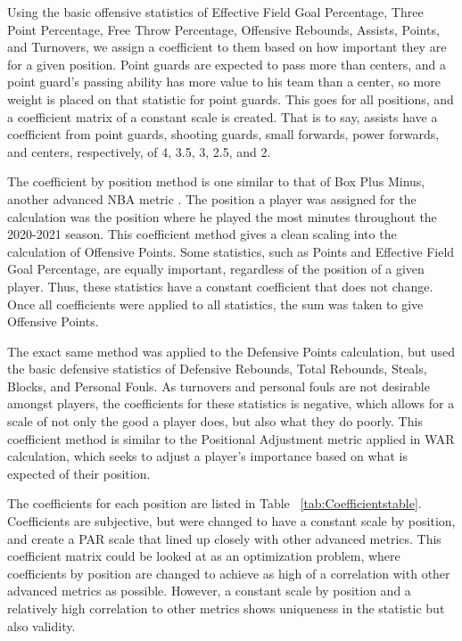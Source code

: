 \documentclass[12pt]{article}
\begin{document}
Using the basic offensive 
statistics of Effective Field Goal 
Percentage, Three Point Percentage, Free Throw Percentage, Offensive 
Rebounds, Assists, Points, and 
Turnovers, we assign a coefficient to them based on how important they 
are for a given position. Point 
guards are expected to pass more than centers, and a point guard's 
passing ability has more value to his 
team than a center, so more weight is placed on that statistic for point 
guards. This goes for all positions, 
and a coefficient matrix of a constant scale is created. That is to say, 
assists have a coefficient from point 
guards, shooting guards, small forwards, power forwards, and centers, 
respectively, of 4, 3.5, 3, 2.5, and 2. 

The coefficient by position method is one similar to that of Box Plus 
Minus, another advanced NBA metric \citep{BasketballReferenceBPM}. 
The position a player was assigned for the calculation was the position 
where he played the most minutes 
throughout the 2020-2021 season. This coefficient method gives a clean 
scaling into the calculation of 
Offensive Points. Some statistics, such as Points and Effective Field Goal 
Percentage, are equally 
important, regardless of the position of a given player. Thus, these 
statistics have a constant coefficient that 
does not change. Once all coefficients were applied to all statistics, the 
sum was taken to give Offensive 
Points. 

The exact same method was applied to the Defensive Points 
calculation, but used the basic 
defensive statistics of Defensive Rebounds, Total Rebounds, Steals, 
Blocks, and Personal Fouls. As 
turnovers and personal fouls are not desirable amongst players, the 
coefficients for these statistics is 
negative, which allows for a scale of not only the good a player does, but 
also what they do poorly. This 
coefficient method is similar to the Positional Adjustment metric applied in 
WAR calculation, which seeks to 
adjust a player's importance based on what is expected of their position.

 
The coefficients for each position are listed in Table~
\ref{tab:Coefficientstable}. Coefficients are subjective, but were changed 
to have a constant scale by position, and create a PAR scale that lined up 
closely with other advanced metrics. This coefficient matrix could be 
looked at as an optimization problem, where coefficients by position are 
changed to achieve as high of a correlation with other advanced metrics 
as possible. However, a constant scale by position and a relatively high 
correlation to other metrics shows uniqueness in the statistic but also 
validity.
\end{document}
